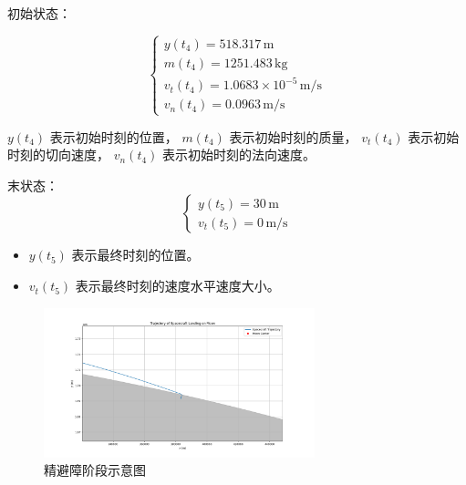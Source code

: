 \documentclass{ctexart}
\begin{document}
初始状态：

\begin{equation}
\begin{cases}
y(t_4) = 518.317 \, \text{m} \\
m(t_4) = 1251.483 \, \text{kg} \\
v_t(t_4) = 1.0683\times 10^{-5} \, \text{m/s} \\
v_n(t_4) = 0.0963 \, \text{m/s}
\end{cases}
\end{equation}


$y(t_4)$ 表示初始时刻的位置，
$m(t_4)$ 表示初始时刻的质量，
$v_t(t_4)$ 表示初始时刻的切向速度，
$v_n(t_4)$ 表示初始时刻的法向速度。

末状态：
\begin{equation}
\begin{cases}
y(t_5) = 30 \, \text{m} \\
v_t(t_5) = 0 \, \text{m/s}
\end{cases}
\end{equation}

\begin{itemize}
\renewcommand\labelitemi{} %
\item $y(t_5)$ 表示最终时刻的位置。
\item $v_t(t_5)$ 表示最终时刻的速度水平速度大小。
\end{itemize}

    \begin{figure}[H] %
        \centering %
        \includegraphics[width=0.7\textwidth]{"./picture/stage4.png"} %
        \caption{精避障阶段示意图} %
        \label{fig:example} %
    \end{figure}
\end{document}
